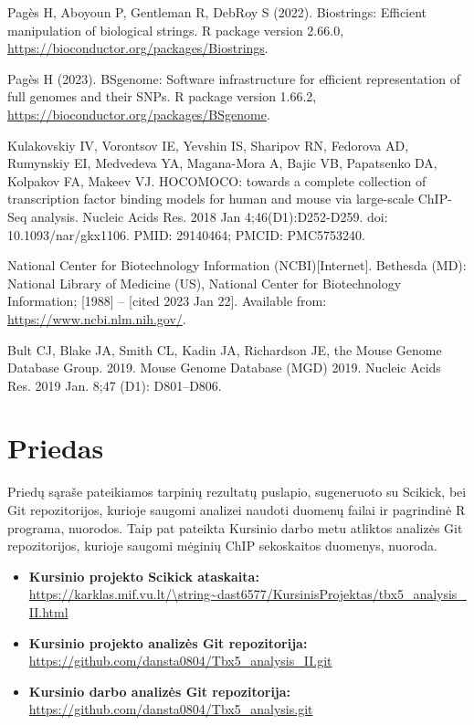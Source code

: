\documentclass[12pt]{article}
\begin{document}
\begin{thebibliography}{99}
 Pagès H, Aboyoun P, Gentleman R, DebRoy S (2022).
Biostrings: Efficient manipulation of biological strings. R package version
2.66.0, \url{https://bioconductor.org/packages/Biostrings}.

 Pagès H (2023). BSgenome: Software infrastructure for
efficient representation of full genomes and their SNPs. R package version
1.66.2, \url{https://bioconductor.org/packages/BSgenome}.

 Kulakovskiy IV, Vorontsov IE, Yevshin IS, Sharipov RN,
Fedorova AD, Rumynskiy EI, Medvedeva YA, Magana-Mora A, Bajic VB, Papatsenko DA,
Kolpakov FA, Makeev VJ. HOCOMOCO: towards a complete collection of transcription
factor binding models for human and mouse via large-scale ChIP-Seq analysis.
Nucleic Acids Res. 2018 Jan 4;46(D1):D252-D259. doi: 10.1093/nar/gkx1106.
PMID: 29140464; PMCID: PMC5753240.

 National Center for Biotechnology Information (NCBI)[Internet].
Bethesda (MD): National Library of Medicine (US), National Center for
Biotechnology Information; [1988] – [cited 2023 Jan 22]. Available from:
\url{https://www.ncbi.nlm.nih.gov/}.

 Bult CJ, Blake JA, Smith CL, Kadin JA, Richardson JE, the
Mouse Genome Database Group. 2019. Mouse Genome Database (MGD) 2019.
Nucleic Acids Res. 2019 Jan. 8;47 (D1): D801–D806.

\end{thebibliography}

\newpage


\section{Priedas} \label{Priedas}
Priedų sąraše pateikiamos tarpinių rezultatų puslapio, sugeneruoto su Scikick,
bei Git re\-po\-zi\-to\-ri\-jos, kurioje saugomi analizei naudoti duomenų
failai ir pagrindinė R programa, nuorodos. Taip pat pateikta Kursinio darbo metu
atliktos analizės Git repozitorijos, kurioje saugomi mėginių ChIP sekoskaitos
duomenys, nuoroda.

\begin{itemize}
    \item \textbf{Kursinio projekto Scikick ataskaita:}\\
          \url{https://karklas.mif.vu.lt/\string~dast6577/KursinisProjektas/tbx5\_analysis\_II.html}
    \item \textbf{Kursinio projekto analizės Git repozitorija:}\\
          \url{https://github.com/dansta0804/Tbx5\_analysis\_II.git}
    \item \textbf{Kursinio darbo analizės Git repozitorija:}\\
          \url{https://github.com/dansta0804/Tbx5\_analysis.git}
  \end{itemize}
\end{document}
